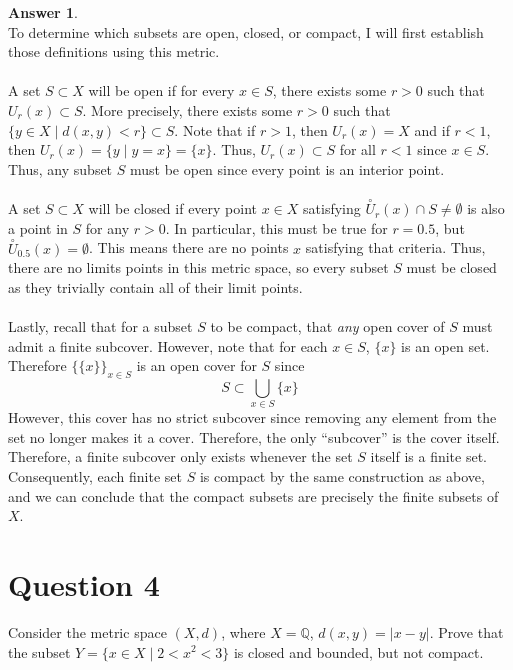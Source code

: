 \documentclass[10pt,a4paper]{article}
\theoremstyle{definition}
\newtheorem*{answer*}{Answer}
\theoremstyle{definition}
\begin{document}
\begin{answer*}$ $
\\To determine which subsets are open, closed, or compact, I will first establish those definitions using this metric. 
\\
\\A set $S \subset X$ will be open if for every $x \in S$, there exists some $r > 0$ such that $U_r(x) \subset S$. More precisely, there exists some $r > 0$ such that $\{y \in X \; | \; d(x, y) < r\} \subset S$. Note that if $r > 1$, then $U_r(x) = X$ and if $r < 1$, then $U_r(x) = \{y \; | \; y = x\} = \{x\}$. Thus, $U_r(x) \subset S$ for all $r < 1$ since $x \in S$. Thus, any subset $S$ must be open since every point is an interior point.  
\\
\\A set $S \subset X$ will be closed if every point $x \in X$ satisfying $\stackrel{\circ}{U}_r(x) \cap S \neq \emptyset$ is also a point in $S$ for any $r > 0$. In particular, this must be true for $r = 0.5$, but $\stackrel{\circ}{U}_{0.5}(x) = \emptyset$. This means there are no points $x$ satisfying that criteria. Thus, there are no limits points in this metric space, so every subset $S$ must be closed as they trivially contain all of their limit points. 
\\
\\Lastly, recall that for a subset $S$ to be compact, that \emph{any} open cover of $S$ must admit a finite subcover. However, note that for each $x \in S$, $\{x\}$ is an open set. Therefore $\{\{x\}\}_{x \in S}$ is an open cover for $S$ since
$$
S \subset \bigcup_{x \in S} \{x\}
$$
However, this cover has no strict subcover since removing any element from the set no longer makes it a cover. Therefore, the only \enquote{subcover} is the cover itself. Therefore, a finite subcover only exists whenever the set $S$ itself is a finite set. Consequently, each finite set $S$ is compact by the same construction as above, and we can conclude that the compact subsets are precisely the finite subsets of $X$. 
\end{answer*}

\section*{Question 4}
Consider the metric space $(X, d)$, where $X = \mathbb{Q}$, $d(x, y) = |x - y|$. Prove that the subset $Y = \{x \in X \; | \; 2 < x^2 < 3\}$ is closed and bounded, but not compact. 
\end{document}
